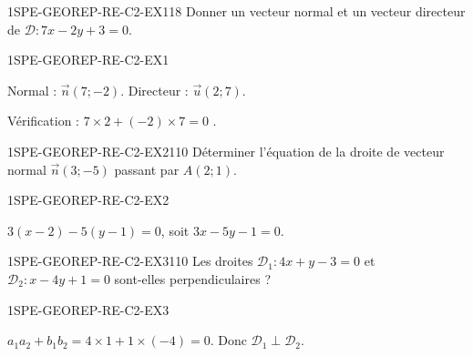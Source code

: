 

\begin{exercice}{1SPE-GEOREP-RE-C2-EX1}{1}{8}
Donner un vecteur normal et un vecteur directeur de $\mathcal{D} : 7x - 2y + 3 = 0$.
\end{exercice}


\begin{corrige}{1SPE-GEOREP-RE-C2-EX1}

Normal : $\vec{n}(7 ; -2)$. Directeur : $\vec{u}(2 ; 7)$.

Vérification : $7 \times 2 + (-2) \times 7 = 0$ \checkmark.

\end{corrige}

\begin{exercice}{1SPE-GEOREP-RE-C2-EX2}{1}{10}
Déterminer l'équation de la droite de vecteur normal $\vec{n}(3 ; -5)$ passant par $A(2 ; 1)$.
\end{exercice}



\begin{corrige}{1SPE-GEOREP-RE-C2-EX2}

$3(x - 2) - 5(y - 1) = 0$, soit $3x - 5y - 1 = 0$.

\end{corrige}

\begin{exercice}{1SPE-GEOREP-RE-C2-EX3}{1}{10}
Les droites $\mathcal{D}_1 : 4x + y - 3 = 0$ et $\mathcal{D}_2 : x - 4y + 1 = 0$ sont-elles perpendiculaires ?
\end{exercice}


\begin{corrige}{1SPE-GEOREP-RE-C2-EX3}

$a_1 a_2 + b_1 b_2 = 4 \times 1 + 1 \times (-4) = 0$. Donc $\mathcal{D}_1 \perp \mathcal{D}_2$.

\end{corrige}

